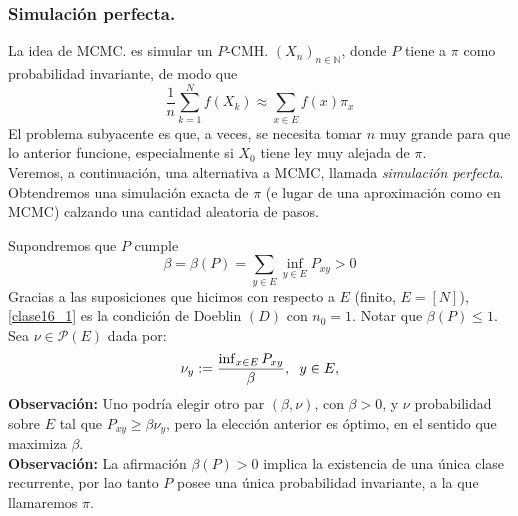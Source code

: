 \documentclass[a4paper]{article}
\numberwithin{equation}{subsection}
\def\N{\mathbb N}
\begin{document}
\subsubsection{Simulación perfecta.}
La idea de MCMC. es simular  un $P$-CMH. $(X_n)_{n\in\N}$, donde  $P$ tiene a $\pi$ como probabilidad invariante, de modo que
\[\frac{1}{n}\sum_{k=1}^Nf(X_k) \approx \sum_{x\in E}f(x)\pi_x\]
El problema subyacente es que, a veces, se necesita tomar $n$ muy grande  para que lo anterior funcione, especialmente si $X_0$ tiene ley muy alejada de $\pi$.\\ \newline
Veremos, a continuación, una alternativa a MCMC, llamada \textit{simulación perfecta}. Obtendremos una simulación exacta de $\pi$ (e lugar de una aproximación como en MCMC) calzando una cantidad aleatoria de pasos.\\ \newline

Supondremos que $P$ cumple  
\begin{equation}
    \beta = \beta(P) = \sum_{y\in E}\inf_{y\in E}P_{xy} > 0
    \label{clase16_1}
\end{equation}
Gracias a las suposiciones que hicimos con respecto a $E$ (finito, $E=[N]$), \ref{clase16_1} es la condición de Doeblin $(D)$ con $n_0=1$. Notar que $\beta(P) \leq 1$.\\
Sea $\nu \in \mathcal{P}(E)$ dada por:
\[\nu_y := \frac{\inf_{x\in E}P_{xy}}{\beta},\hspace{0.2cm}y\in E,\]
\textbf{Observación: }Uno podría elegir otro par $(\beta,\nu)$, con $\beta >0$, y $\nu$ probabilidad sobre $E$ tal que $P_{xy}\geq \beta \nu_y$, pero la elección anterior es óptimo, en el sentido que maximiza $\beta$.\\ \newline
\textbf{Observación: }La afirmación $\beta(P)>0$ implica la existencia de una única clase recurrente, por lao tanto $P$ posee una única probabilidad invariante, a la que llamaremos $\pi$.\\ \newline
\end{document}
